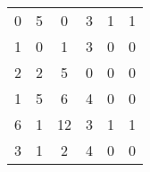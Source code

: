 \begin{tabular}{cccccc}
\rowcolor[rgb]{ .749,  .749,  .749} 0      & 5      & 0      & 3      & 1      & 1 \\
\rowcolor[rgb]{ .749,  .749,  .749} 1      & 0      & 1      & 3      & 0      & 0 \\
\rowcolor[rgb]{ .749,  .749,  .749} 2      & 2      & 5      & 0      & 0      & 0 \\
1      & 5      & 6      & 4      & \cellcolor[rgb]{ .749,  .749,  .749} 0 & \cellcolor[rgb]{ .749,  .749,  .749} 0 \\
6      & 1      & 12     & 3      & \cellcolor[rgb]{ .749,  .749,  .749} 1 & \cellcolor[rgb]{ .749,  .749,  .749} 1 \\
3      & 1      & 2      & 4      & \cellcolor[rgb]{ .749,  .749,  .749} 0 & \cellcolor[rgb]{ .749,  .749,  .749} 0 \bigstrut[b]\\
\hline
\hline
\end{tabular}%
